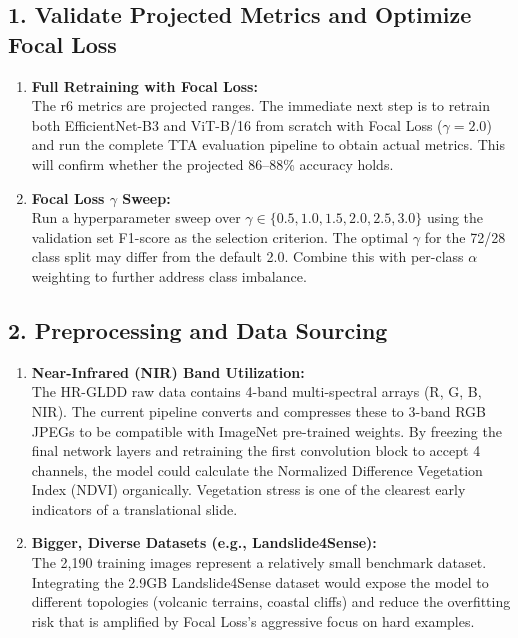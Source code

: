 \documentclass[11pt]{article}
\begin{document}
\subsection{1. Validate Projected Metrics and Optimize Focal Loss}
\begin{enumerate}
    \item \textbf{Full Retraining with Focal Loss:}\\
          The r6 metrics are projected ranges. The immediate next step is to retrain both EfficientNet-B3 and ViT-B/16 from scratch with Focal Loss ($\gamma = 2.0$) and run the complete TTA evaluation pipeline to obtain actual metrics. This will confirm whether the projected 86--88\% accuracy holds.
    \item \textbf{Focal Loss $\gamma$ Sweep:}\\
          Run a hyperparameter sweep over $\gamma \in \{0.5, 1.0, 1.5, 2.0, 2.5, 3.0\}$ using the validation set F1-score as the selection criterion. The optimal $\gamma$ for the 72/28 class split may differ from the default 2.0. Combine this with per-class $\alpha$ weighting to further address class imbalance.
\end{enumerate}

\subsection{2. Preprocessing and Data Sourcing}
\begin{enumerate}
    \item \textbf{Near-Infrared (NIR) Band Utilization:}\\
          The HR-GLDD raw data contains 4-band multi-spectral arrays (R, G, B, NIR). The current pipeline converts and compresses these to 3-band RGB JPEGs to be compatible with ImageNet pre-trained weights. By freezing the final network layers and retraining the first convolution block to accept 4 channels, the model could calculate the Normalized Difference Vegetation Index (NDVI) organically. Vegetation stress is one of the clearest early indicators of a translational slide.
    \item \textbf{Bigger, Diverse Datasets (e.g., Landslide4Sense):}\\
          The 2,190 training images represent a relatively small benchmark dataset. Integrating the 2.9GB Landslide4Sense dataset would expose the model to different topologies (volcanic terrains, coastal cliffs) and reduce the overfitting risk that is amplified by Focal Loss's aggressive focus on hard examples.
\end{enumerate}
\end{document}
